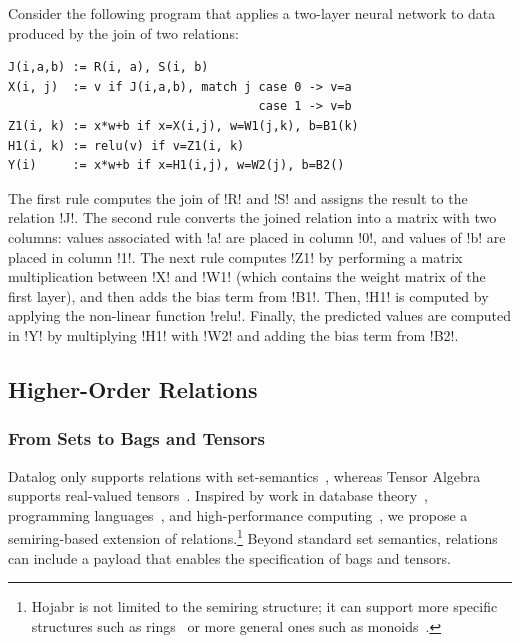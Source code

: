 \documentclass[sigconf,nonacm]{acmart}
\begin{document}
 Consider the following program that applies a two-layer neural network to data produced by the join of two relations:


\begin{myboxed}
\begin{lstlisting}
J(i,a,b) := R(i, a), S(i, b)
X(i, j)  := v if J(i,a,b), match j case 0 -> v=a
                                   case 1 -> v=b
Z1(i, k) := x*w+b if x=X(i,j), w=W1(j,k), b=B1(k)
H1(i, k) := relu(v) if v=Z1(i, k)
Y(i)     := x*w+b if x=H1(i,j), w=W2(j), b=B2()
\end{lstlisting}
\end{myboxed}

The first rule computes the join of !R! and !S! and assigns the result to the relation !J!. The second rule converts the joined relation into a matrix with two columns: values associated with !a! are placed in column !0!, and values of !b! are placed in column !1!. The next rule computes !Z1! by performing a matrix multiplication between !X! and !W1! (which contains the weight matrix of the first layer), and then adds the bias term from !B1!. Then, !H1! is computed by applying the non-linear function !relu!. Finally, the predicted values are computed in !Y! by multiplying !H1! with !W2! and adding the bias term from !B2!.



\subsection{Higher-Order Relations}
\subsubsection{From Sets to Bags and Tensors} 

Datalog only supports relations with set-semantics~\cite{abiteboul1995foundations}, whereas Tensor Algebra supports real-valued tensors~\cite{vasilache2018tensor}. Inspired by work in database theory~\cite{abo2016faq,green2007provenance,abo2024convergence,koch2010incremental}, programming languages~\cite{DBLP:journals/pacmpl/ShaikhhaHSO22,shaikhha2019finally,dolan2013fun}, and high-performance computing~\cite{kepner2011graph,graph_blas}, we propose a semiring-based extension of relations.\footnote{Hojabr is not limited to the semiring structure; it can support more specific structures such as rings~\cite{koch2010incremental} or more general ones such as monoids~\cite{fegaras2000optimizing}.} Beyond standard set semantics, relations can include a payload that enables the specification of bags and tensors.
\end{document}
